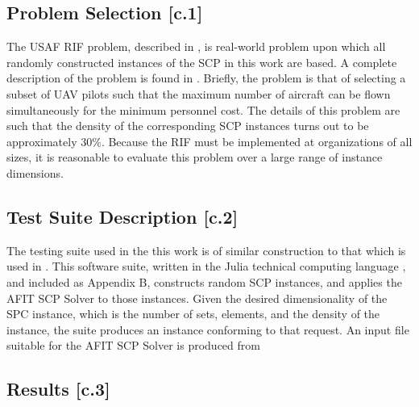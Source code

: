 \documentclass[12pt]{article}
\begin{document}
	\subsection{Problem Selection [c.1]} \label{scn:problem_selection}
	The USAF RIF problem, described in \cite{hw5_knapp_fletcher_csce_686}, is real-world problem upon which all randomly constructed instances of the SCP in this work are based. A complete description of the problem is found in \cite{hw5_knapp_fletcher_csce_686}. Briefly, the problem is that of selecting a subset of UAV pilots such that the maximum number of aircraft can be flown simultaneously for the minimum personnel cost. The details of this problem are such that the density of the corresponding SCP instances turns out to be approximately $30\%$. Because the RIF must be implemented at organizations of all sizes, it is reasonable to evaluate this problem over a large range of instance dimensions.
	
	\subsection{Test Suite Description [c.2]}
	
	The testing suite used in the this work is of similar construction to that which is used in \cite{hw5_knapp_fletcher_csce_686}. This software suite, written in the Julia technical computing language \cite{Julia}, and included as Appendix B, constructs random SCP instances, and applies the AFIT SCP Solver to those instances. Given the desired dimensionality of the SPC instance, which is the number of sets, elements, and the density of the instance, the suite produces an instance conforming to that request. An input file suitable for the AFIT SCP Solver is produced from  
	
	\subsection{Results [c.3]}
	
\end{document}
